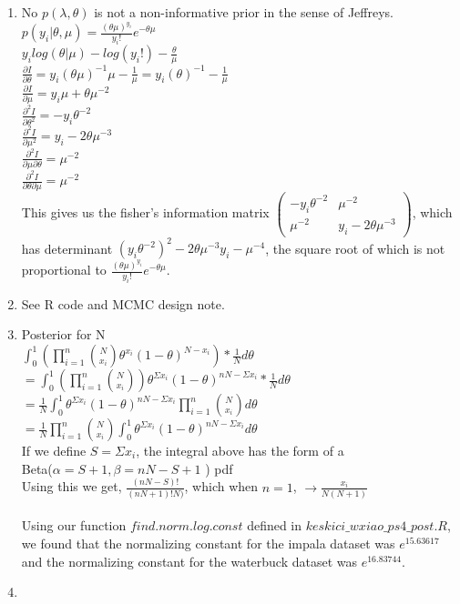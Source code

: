\documentclass[paper=a4, fontsize=11pt]{scrartcl}
\newcommand{\parens}[1]{ \left( #1 \right) }
\begin{document}
\begin{enumerate}
\begin{enumerate}[1]
	\item No $p(\lambda, \theta)$ is not a non-informative prior in the sense of Jeffreys.\\ 
	$p(y_i| \theta, \mu) = \frac{(\theta \mu)^{y_{i}}}{y_{i}!} e^{-\theta \mu}$\\
	$y_i log(\theta | \mu ) - log({y_i}!) - \frac{\theta}{\mu}$\\
	$\frac{\partial I}{\partial \theta} = y_i (\theta \mu)^{-1} \mu - \frac{1}{\mu} = 
	y_i (\theta)^{-1} - \frac{1}{\mu}$\\
	$\frac{\partial I}{\partial \mu} = y_i \mu + \theta \mu^{-2}$	\\
	$\frac{\partial^2 I}{\partial \theta^2} = -{y_i}\theta^{-2}$\\
	$\frac{\partial^2 I}{\partial \mu^2} = y_i - 2\theta \mu^{-3}$\\
	$\frac{\partial^2 I}{\partial \mu \partial \theta} = \mu^{-2}$\\
	$\frac{\partial^2 I}{\partial \theta \partial \mu } = \mu^{-2}$\\
	This gives us the fisher's information matrix $\begin{pmatrix}-{y_i}\theta^{-2} & \mu^{-2} \\\mu^{-2} & y_i - 2\theta \mu^{-3} \end{pmatrix}$, which has determinant $({y_i}\theta^{-2})^2 - 2\theta \mu^{-3}y_i - \mu^{-4}$, the square root of which is not proportional to $\frac{(\theta \mu)^{y_{i}}}{y_{i}!} e^{-\theta \mu}$.


	
	\item See R code and MCMC design note.
	
	\item Posterior for N\\
	$\int^1_0 \parens{\prod_{i=1}^n\binom{N}{x_i}\theta^{x_i}(1-\theta)^{N - x_i}}* \frac{1}{N} d\theta$\\
	$=\int^1_0 \parens{\prod_{i=1}^n\binom{N}{x_i}}\theta^{\Sigma x_i}(1-\theta)^{nN - \Sigma x_i}* \frac{1}{N} d\theta$\\
	$= \frac{1}{N} \int^1_0 \theta^{\Sigma x_i}(1-\theta)^{nN - \Sigma x_i}\prod_{i=1}^n\binom{N}{x_i} d\theta$\\
	$= \frac{1}{N} \prod_{i=1}^n\binom{N}{x_i}  \int^1_0 \theta^{\Sigma x_i}(1-\theta)^{nN - \Sigma x_i}d\theta$\\
	If we define $S = \Sigma x_i$, the integral above has the form of a\\ 
	Beta($\alpha=S+1, \beta=nN - S + 1$ ) pdf\\
	Using this we get, $\frac{(nN-S)!}{(nN + 1)!N)}$, which when $n=1$, $\rightarrow \frac{x_i}{N(N+1)}$\\\\
	Using our function $find.norm.log.const$ defined in $keskici\_wxiao\_ps4\_post.R$, we found that the normalizing constant for the impala dataset was $e^{15.63617}$ and the normalizing constant for the waterbuck dataset was $e^{16.83744}$.
	
	\item
      
    \end{enumerate}
\end{enumerate}
\end{document}
